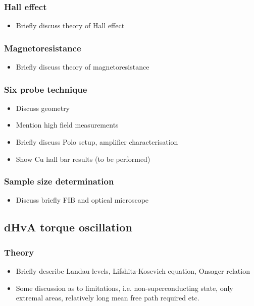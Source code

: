 \documentclass[11pt, a4paper]{article}
\begin{document}
        \subsubsection{Hall effect}
            \begin{itemize}
                \item Briefly discuss theory of Hall effect
            \end{itemize}
        \subsubsection{Magnetoresistance}
            \begin{itemize}
                \item Briefly discuss theory of magnetoresistance
            \end{itemize}
        \subsubsection{Six probe technique}
            \begin{itemize}
                \item Discuss geometry
                \item Mention high field measurements
                \item Briefly discuss Polo setup, amplifier characterisation
                \item Show Cu hall bar results (to be performed)
            \end{itemize}
        \subsubsection{Sample size determination}
            \begin{itemize}
                \item Discuss briefly FIB and optical microscope
            \end{itemize}

    \subsection{dHvA torque oscillation}
        \subsubsection{Theory}
            \begin{itemize}
                \item Briefly describe Landau levels, Lifshitz-Kosevich equation, Onsager relation
                \item Some discussion as to limitations, i.e. non-superconducting state, only extremal areas, relatively long mean free path required etc.
            \end{itemize}
\end{document}

